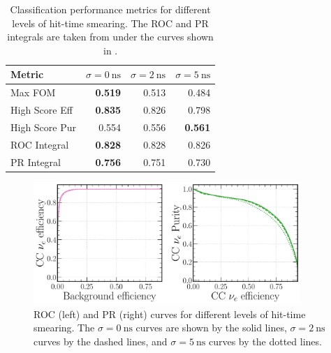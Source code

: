 \begin{table} %
    \begin{tabular}{lrrr}
        Metric         & $\sigma=0~\text{ns}$ & $\sigma=2~\text{ns}$ & $\sigma=5~\text{ns}$ \\
        \midrule
        Max FOM        & \textbf{0.519}       & 0.513                & 0.484                \\
        High Score Eff & \textbf{0.835}       & 0.826                & 0.798                \\
        High Score Pur & 0.554                & 0.556                & \textbf{0.561}       \\
        ROC Integral   & \textbf{0.828}       & 0.828                & 0.826                \\
        PR Integral    & \textbf{0.756}       & 0.751                & 0.730                \\
    \end{tabular}
    \caption[Classification performance metrics for different levels of hit-time smearing]
    {Classification performance metrics for different levels of hit-time smearing. The ROC and PR
        integrals are taken from under the curves shown in
        .}
    \label{tab:calib_time}
\end{table}

\begin{figure} %
    \includegraphics[width=0.9\textwidth]{diagrams/7-results/calib_time_nuel_comp_curves.pdf}
    \caption[Receiver operating characteristic and precision-recall curves for different levels of
        hit-time smearing] {ROC (left) and PR (right) curves for different levels of hit-time
        smearing. The $\sigma=0~\text{ns}$ curves are shown by the solid lines,
        $\sigma=2~\text{ns}$ curves by the dashed lines, and $\sigma=5~\text{ns}$ curves by the
        dotted lines.}
    \label{fig:calib_time_nuel_comp_curves}
\end{figure}

